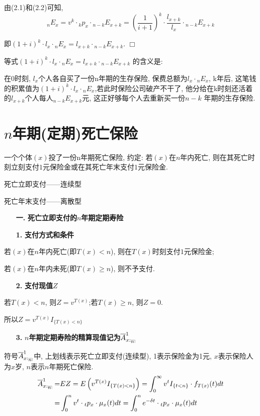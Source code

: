 \documentclass[a4paper,10pt]{ctexbook}
\makeatletter
\newcommand{\hei}{\CJKfamily{hei}}      %
\def\qed{\hfill$\Box$\medskip}
\DeclareRobustCommand{\annu}[1]{_{%
    \def\arraystretch{0}%
    \setlength\arraycolsep{1pt}%
    \setlength\arrayrulewidth{.2pt}%
    \begin{array}[b]{@{}c|}\hline
        \\[\arraycolsep]%
        \scriptstyle #1%
    \end{array}%
}}
\makeatother
\begin{document}
由(2.1)和(2.2)可知,
$$_nE_x=v^k\cdot {}_kp_x\cdot {}_{n-k}E_{x+k}=(\frac{1}{i+1})^k\cdot\frac{l_{x+k}}{l_x}\cdot {}_{n-k}E_{x+k}$$

即$(1+i)^k\cdot l_x\cdot {}_nE_x=l_{x+k}\cdot {}_{n-k}E_{x+k}$.
\qed


\begin{remark}
    等式$(1+i)^k\cdot l_x\cdot {}_nE_x=l_{x+k}\cdot {}_{n-k}E_{x+k}$ 的含义是:

    在0时刻, $l_x$个人各自买了一份n年期的生存保险, 保费总额为$l_x\cdot {}_nE_x$, k年后, 这笔钱的积累值为$(1+i)^k\cdot l_x\cdot {}_nE_x$,若此时保险公司破产不干了, 他分给在k时刻还活着的$l_{x+k}$个人每人$_{n-k}E_{x+k}$元, 这正好够每个人去重新买一份$n-k$ 年期的生存保险.
\end{remark}
\section{$n$年期(定期)死亡保险}

一个个体$(x)$投了一份n年期死亡保险, 约定: 若$(x)$在$n$年内死亡, 则在其死亡时刻立刻支付$1$元保险金或在其死亡年末支付$1$元保险金.

死亡立即支付——连续型

死亡年末支付——离散型
\begin{itemize}
    \item[{\bf\hei 一.}]{\bf\hei 死亡立即支付的$n$年期定期寿险}
\end{itemize}
\begin{itemize}
    \item[{\bf\hei 1.}]{\bf\hei 支付方式和条件}
\end{itemize}

若$(x)$在$n$年内死亡(即$T(x)<n$), 则在$T(x)$时刻支付$1$元保险金;

若$(x)$在$n$年内未死(即$T(x)\geqslant n$), 则不予支付.
\begin{itemize}
    \item[{\bf\hei 2.}]{\bf\hei 支付现值$Z$}
\end{itemize}

若$T(x)<n$, 则$Z=v^{T(x)}$;若$T(x)\geqslant n$, 则$Z=0$.

所以$Z=v^{T(x)}I_{\{T(x)<n\}}$
\begin{itemize}
    \item[{\bf\hei 3.}]{\bf\hei $n$年期定期寿险的精算现值记为$\overline{A}_{x:\annu{n}}^1$}
\end{itemize}
\begin{remark}
    符号$\overline{A}_{x:\annu{n}}^1$中, 上划线表示死亡立即支付(连续型), 1表示保险金为1元, $x$表示保险人为$x$岁, $n$表示$n$年期死亡保险.
    \begin{align*}
        \overline{A}_{x:\annu{n}}^1= & EZ=E\left( v^{T\left( x \right)}I_{\left\{ T\left( x \right) <n \right\}} \right) =\int_0^{\infty}{v^{t}I_{\left\{ t <n \right\}}\cdot f_{T(x)}(t)dt} \\
        =                            & \int_0^{n}{v^{t}\cdot {}_tp_x\cdot \mu_{x}(t)dt}=\int_0^{n}{e^{-\delta t}\cdot {}_tp_x\cdot \mu_{x}(t)dt}
    \end{align*}
\end{remark}
\end{document}

